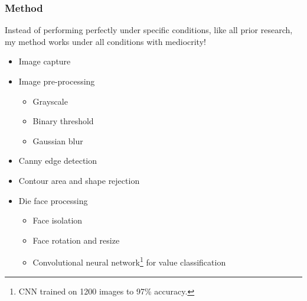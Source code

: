 \documentclass{beamer}
\begin{document}
\begin{frame}
\frametitle{Method}

Instead of performing perfectly under specific conditions, like all prior research, my method works under all conditions with mediocrity!

\begin{itemize}
	\item Image capture
	\item Image pre-processing
	\begin{itemize}
		\item Grayscale
		\item Binary threshold
		\item Gaussian blur
	\end{itemize}
	\item Canny edge detection
	\item Contour area and shape rejection
	\item Die face processing
	\begin{itemize}
		\item Face isolation
		\item Face rotation and resize
		\item Convolutional neural network\footnote{CNN trained on 1200 images to 97\% accuracy.} for value classification
	\end{itemize}
\end{itemize}

\end{frame}



\end{document}
